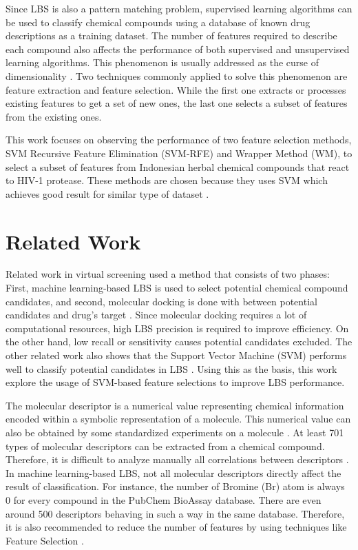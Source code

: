 \documentclass[conference]{IEEEtran}
\begin{document}
Since LBS is also a pattern matching problem, supervised learning algorithms can be used to classify chemical compounds using a database of known drug descriptions as a training dataset. The number of features required to describe each compound also affects the performance of both supervised and unsupervised learning algorithms. This phenomenon is usually addressed as the curse of dimensionality \cite{janecek2008relationship}. Two techniques commonly applied to solve this phenomenon are feature extraction and feature selection. While the first one extracts or processes existing features to get a set of new ones, the last one selects a subset of features from the existing ones. 

This work focuses on observing the performance of two feature selection methods, SVM Recursive Feature Elimination (SVM-RFE) and Wrapper Method (WM), to select a subset of features from Indonesian herbal chemical compounds that react to HIV-1 protease. These methods are chosen because they uses SVM which achieves good result for similar type of dataset \cite{korkmaz2014drug}.

\section{Related Work}

Related work in virtual screening used a method that consists of two phases: First, machine learning-based LBS is used to select potential chemical compound candidates, and second, molecular docking is done with between potential candidates and drug's target \cite{hilman2012analisis}. Since molecular docking requires a lot of computational resources, high LBS precision is required to improve efficiency. On the other hand, low recall or sensitivity causes potential candidates excluded. The other related work also shows that the Support Vector Machine (SVM) performs well to classify potential candidates in LBS \cite{korkmaz2014drug}. Using this as the basis, this work explore the usage of SVM-based feature selections to improve LBS performance.

The molecular descriptor is a numerical value representing chemical information encoded within a symbolic representation of a molecule. This numerical value can also be obtained by some standardized experiments on a molecule \cite{yap2011padel}. At least 701 types of molecular descriptors can be extracted from a chemical compound. Therefore, it is difficult to analyze manually all correlations between descriptors \cite{korkmaz2014drug}. In machine learning-based LBS, not all molecular descriptors directly affect the result of classification. For instance, the number of Bromine (Br) atom is always 0 for every compound in the PubChem BioAssay database. There are even around 500 descriptors behaving in such a way in the same database. Therefore, it is also recommended to reduce the number of features by using techniques like Feature Selection \cite{korkmaz2014drug}.
\end{document}
